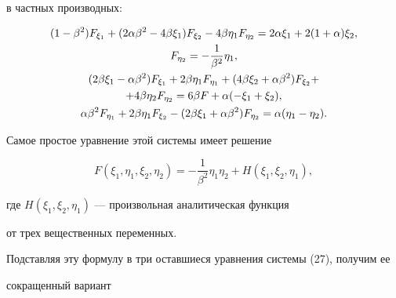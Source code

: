 в частных производных:


\begin{gather}


 ( 1- \beta^2) 


F_{\xi_1} + ( 2 \alpha \beta^2 - 4 \beta \xi_1 ) 


F_{\xi_2} - 4 \beta \eta_1F_{\eta_2} 


= 2 \alpha \xi_1 + 2 ( 1 + \alpha) \xi_2, \notag \\


F_{\eta_2 } = - \frac 1{\beta^2} \eta_1, \\


 ( 2 \beta \xi_1- \alpha \beta^2 ) F_{\xi_1} + 


 2 \beta \eta_1 F_{\eta_1} 


 + ( 4 \beta \xi_2 + \alpha \beta^2 ) F_{\xi_2} +\notag \\


 + 4 \beta \eta_2 F_{\eta_2} = 


6 \beta F + \alpha (- \xi_1 + \xi_2 ), \notag \\


 \alpha \beta^2F_{\eta_1} +  2 \beta \eta_1


F_{\xi_2}  - ( 2 \beta \xi_1 + \alpha \beta^2 ) 


F_{\eta_2} = 


\alpha (\eta_1 - \eta_2 ).\notag


\end{gather}





Самое простое уравнение этой системы имеет решение


$$


 F (\xi_1, \eta_1, \xi_2, \eta_2 ) = 


- \frac 1{\beta^2} \eta_1 \eta_2 + H( \xi_1, \xi_2, \eta_1 ), 


$$


где $ H(\xi_1, \xi_2, \eta_1 ) $ --- произвольная аналитическая функция 


от трех вещественных переменных. 





Подставляя эту формулу в три оставшиеся уравнения системы (27), получим ее


сокращенный вариант


